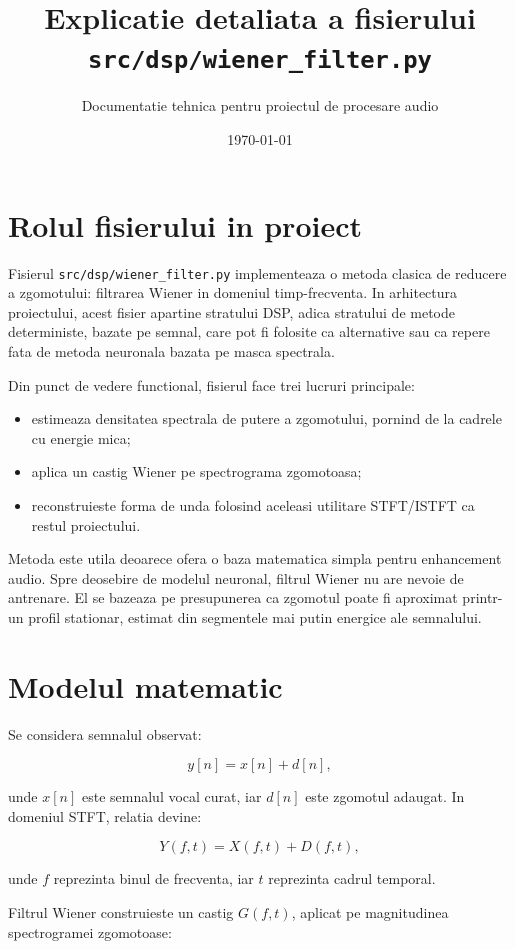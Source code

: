 \documentclass[12pt,a4paper]{report}
\title{Explicatie detaliata a fisierului \texttt{src/dsp/wiener\_filter.py}}
\author{Documentatie tehnica pentru proiectul de procesare audio}
\date{\today}
\begin{document}
\maketitle
\tableofcontents

\chapter{Rolul fisierului in proiect}

Fisierul \texttt{src/dsp/wiener\_filter.py} implementeaza o metoda clasica de reducere a zgomotului: filtrarea Wiener in domeniul timp-frecventa. In arhitectura proiectului, acest fisier apartine stratului DSP, adica stratului de metode deterministe, bazate pe semnal, care pot fi folosite ca alternative sau ca repere fata de metoda neuronala bazata pe masca spectrala.

Din punct de vedere functional, fisierul face trei lucruri principale:

\begin{itemize}
    \item estimeaza densitatea spectrala de putere a zgomotului, pornind de la cadrele cu energie mica;
    \item aplica un castig Wiener pe spectrograma zgomotoasa;
    \item reconstruieste forma de unda folosind aceleasi utilitare STFT/ISTFT ca restul proiectului.
\end{itemize}

Metoda este utila deoarece ofera o baza matematica simpla pentru enhancement audio. Spre deosebire de modelul neuronal, filtrul Wiener nu are nevoie de antrenare. El se bazeaza pe presupunerea ca zgomotul poate fi aproximat printr-un profil stationar, estimat din segmentele mai putin energice ale semnalului.

\chapter{Modelul matematic}

Se considera semnalul observat:

\[
y[n] = x[n] + d[n],
\]

unde \(x[n]\) este semnalul vocal curat, iar \(d[n]\) este zgomotul adaugat. In domeniul STFT, relatia devine:

\[
Y(f,t) = X(f,t) + D(f,t),
\]

unde \(f\) reprezinta binul de frecventa, iar \(t\) reprezinta cadrul temporal.

Filtrul Wiener construieste un castig \(G(f,t)\), aplicat pe magnitudinea spectrogramei zgomotoase:
\end{document}
